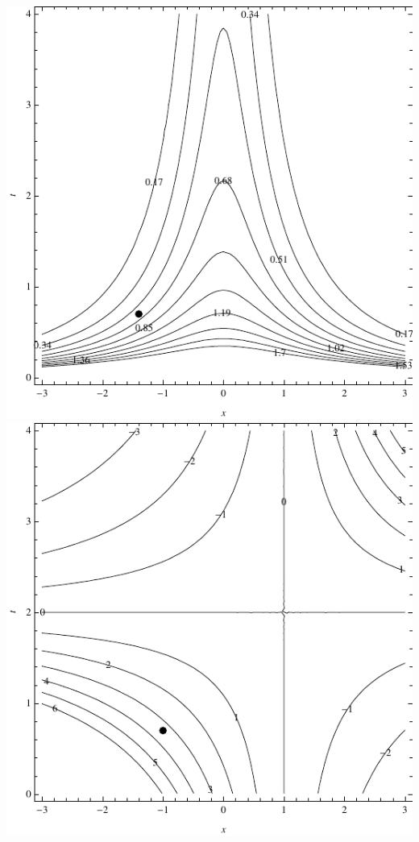 \documentclass[12pt]{exam}
\begin{document}
\begin{questions}
\begin{parts}
\includegraphics[scale=0.75]{F2011_exam_2_fig2} \hspace{1.6em}
\includegraphics[scale=0.75]{F2011_exam_2_fig4} \\


\end{parts}
\end{questions}
\end{document}
